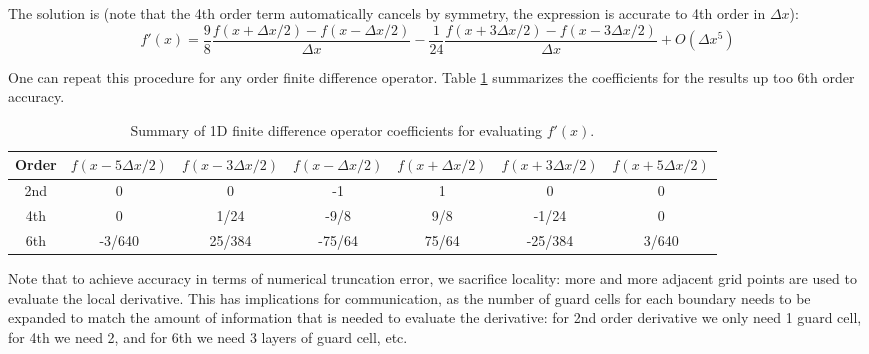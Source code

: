 The solution is (note that the 4th order term automatically cancels by symmetry,
the expression is accurate to 4th order in $\Delta x$):
\begin{equation}
  \label{eq:4th-order-sol}
  f'(x) = \frac{9}{8}\frac{f(x + \Delta x/2) - f(x - \Delta x / 2)}{\Delta x} - \frac{1}{24}\frac{f(x + 3\Delta x / 2) - f(x - 3\Delta x / 2)}{\Delta x} + O(\Delta x^5)
\end{equation}

One can repeat this procedure for any order finite difference operator. Table
\ref{tab:finite-diff} summarizes the coefficients for the results up too 6th
order accuracy.

\begin{table}[h]
  \centering
  \begin{tabular}{ccccccc}
    Order & $f(x - 5\Delta x/2)$ & $f(x - 3\Delta x / 2)$ & $f(x - \Delta x/2)$ & $f(x + \Delta x/2)$ & $f(x + 3\Delta x/2)$ & $f(x + 5\Delta x/2)$  \\ \hline
    2nd & 0 & 0 & -1 & 1 & 0 & 0 \\ \hline
    4th & 0 & 1/24 & -9/8 & 9/8 & -1/24 & 0 \\ \hline
    6th & -3/640 & 25/384 & -75/64 & 75/64 & -25/384 & 3/640 \\ \hline
  \end{tabular}
  \caption{Summary of 1D finite difference operator coefficients for evaluating $f'(x)$.}
  \label{tab:finite-diff}
\end{table}

Note that to achieve accuracy in terms of numerical truncation error, we
sacrifice locality: more and more adjacent grid points are used to evaluate the
local derivative. This has implications for communication, as the number of
guard cells for each boundary needs to be expanded to match the amount of
information that is needed to evaluate the derivative: for 2nd order derivative
we only need 1 guard cell, for 4th we need 2, and for 6th we need 3 layers of
guard cell, etc.

